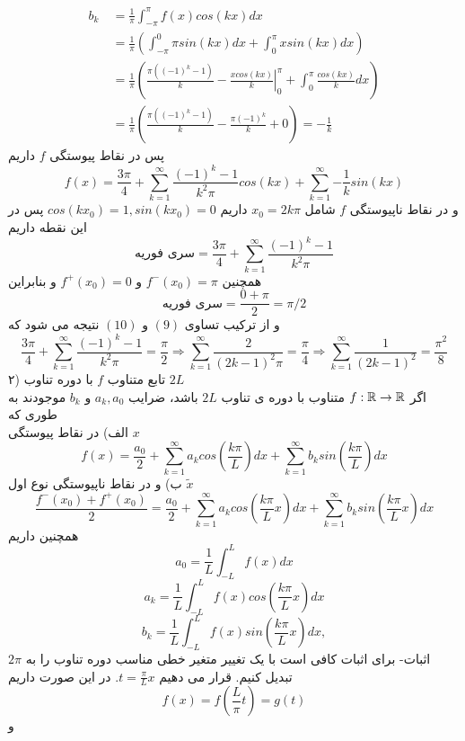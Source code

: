 \begin{equation*}
	\begin{aligned}
		b_k {} &\
		=\frac{1}{\pi}\int_{-\pi}^{\pi}{f(x)cos(kx)dx}\\
		&\
		=\frac{1}{\pi}\left(\int_{-\pi}^{0}{\pi sin(kx)dx}+\int_{0}^\pi{xsin(kx)dx}\right)\\
		&\
		=\frac{1}{\pi}\left(\frac{\pi\left((-1)^k-1\right)}{k}-\left.{\frac{xcos(kx)}{k}}\right |_0^\pi+\int_0^\pi{\frac{cos(kx)}{k}dx}\right)\\
		&\
		=\frac{1}{\pi}\left(\frac{\pi\left((-1)^k-1\right)}{k}-\frac{\pi(-1)^k}{k}+0\right)=-\frac{1}{k}
	\end{aligned}
\end{equation*}
پس در نقاط پیوستگی 
$f$
داریم
\[
f(x)=\frac{3\pi}{4}+\sum_{k=1}^\infty{\frac{(-1)^k-1}{k^2\pi}cos(kx)}+\sum_{k=1}^\infty{-\frac{1}{k}sin(kx)}
\]
و در نقاط ناپیوستگی 
$f$
شامل
$x_0=2k\pi$
داریم 
$cos(kx_0)=1,sin(kx_0)=0$
پس در این نقطه داریم
\begin{equation}
	\text{سری فوریه}=
	\frac{3\pi}{4}+\sum_{k=1}^\infty{\frac{(-1)^k-1}{k^2\pi}}
\end{equation}
همچنین 
$f^-(x_0)=\pi$
و
$f^+(x_0)=0$
و بنابراین 
\begin{equation}
	\text{سری فوریه}=
	\frac{0+\pi}{2}=\pi/2
\end{equation}
و از ترکیب تساوی
$(9)$
و
$(10)$
نتیجه می شود که
\[
\frac{3\pi}{4}+\sum_{k=1}^\infty{\frac{(-1)^k-1}{k^2\pi}}=\frac{\pi}{2}\Rightarrow
\sum_{k=1}^\infty{\frac{2}{(2k-1)^2\pi}}=\frac{\pi}{4}\Rightarrow
\sum_{k=1}^\infty{\frac{1}{(2k-1)^2}}=\frac{\pi^2}{8}
\]
۲) تابع متناوب
$f$
با دوره تناوب
$2L$\\
اگر
$f:\mathbb{R}\to\mathbb{R}$
متناوب با دوره ی تناوب 
$2L$
باشد، ضرایب 
$a_k,a_0$
و
$b_k$
موجودند به طوری که\\
الف) در نقاط پیوستگی 
$x$
\[
f(x)=\frac{a_0}{2}+\sum_{k=1}^\infty{a_kcos\left(\frac{k\pi}{L}\right)dx}+\sum_{k=1}^\infty{b_ksin\left(\frac{k\pi}{L}\right)dx}
\]
ب) و در نقاط ناپیوستگی نوع اول
$\tilde{x}$
\[
\frac{f^-(x_0)+f^+(x_0)}{2}=\frac{a_0}{2}+\sum_{k=1}^\infty{a_kcos\left(\frac{k\pi}{L}x\right)dx}+\sum_{k=1}^\infty{b_ksin\left(\frac{k\pi}{L}x\right)dx}
\]
همچنین داریم
\[
a_0=\frac{1}{L}\int_{-L}^L{f(x)dx}
\]
\[
a_k=\frac{1}{L}\int_{-L}^L{f(x)cos\left(\frac{k\pi}{L}x\right)dx}
\]
\[
b_k=\frac{1}{L}\int_{-L}^L{f(x)sin\left(\frac{k\pi}{L}x\right)dx},
\]
اثبات- برای اثبات کافی است با یک تغییر متغیر خطی مناسب دوره تناوب را به
$2\pi$
تبدیل کنیم. قرار می دهیم
$t=\frac{\pi}{L}x$.
در این صورت داریم
\[
f(x)=f(\frac{L}{\pi}t)=g(t)
\]
و 
